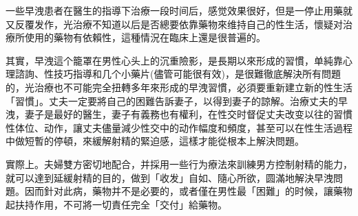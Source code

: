 \documentclass[12pt,UTF8]{ctexbook}
\begin{document}
一些早洩患者在醫生的指導下治療一段时间后，感觉效果很好，但是一停止用藥就又反覆发作，光治療不知道以后是否總要依靠藥物來维持自己的性生活，懷疑对治療所使用的藥物有依賴性，這種情況在臨床上還是很普遍的。

其實，早洩這个籠罩在男性心头上的沉重險影，是長期以來形成的習慣，单純靠心理諮詢、性技巧指導和几个小藥片(儘管可能很有效)，是很難徹底解決所有問題的，光治療也不可能完全扭轉多年來形成的早洩習慣，必須要重新建立新的性生活「習慣」。丈夫一定要將自己的困難告訴妻子，以得到妻子的諒解。治療丈夫的早洩，妻子是最好的醫生，妻子有義務也有權利，在性交时督促丈夫改变以往的習慣性体位、动作，讓丈夫儘量減少性交中的动作幅度和頻度，甚至可以在性生活過程中做短暫的停頓，來緩解射精的緊迫感，這樣才能從根本上解決問題。

實際上。夫婦雙方密切地配合，并採用一些行为療法來訓練男方控制射精的能力，就可以達到延緩射精的目的，做到「收发」自如、隨心所欲，圆滿地解決早洩問題。因而針对此病，藥物并不是必要的，或者僅在男性最「困難」的时候，讓藥物起扶持作用，不可將一切責任完全「交付」給藥物。

\backmatter
\end{document}
